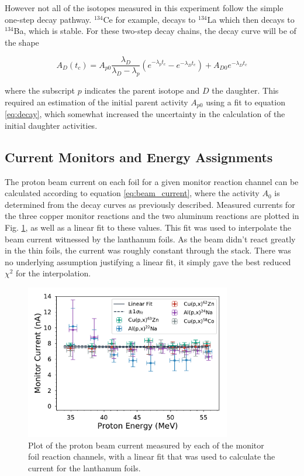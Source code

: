 \documentclass[aps,twocolumn,secnumarabic,balancelastpage,amsmath,amssymb,nofootinbib,floatfix]{revtex4-1}
\begin{document}
However not all of the isotopes measured in this experiment follow the simple one-step decay pathway.  $^{134}$Ce for example, decays to $^{134}$La which then decays to $^{134}$Ba, which is stable.  For these two-step decay chains, the decay curve will be of the shape

\begin{equation}
A_D(t_c) = A_{p0}\frac{\lambda_D}{\lambda_D - \lambda_p}(e^{-\lambda_p t_c}-e^{-\lambda_D t_c})+A_{D0}e^{-\lambda_D t_c}
\end{equation}

where the subscript $p$ indicates the parent isotope and $D$ the daughter.  This required an estimation of the initial parent activity $A_{p0}$ using a fit to equation \ref{eq:decay}, which somewhat increased the uncertainty in the calculation of the initial daughter activities.

\subsection{Current Monitors and Energy Assignments}
\label{monitors}

The proton beam current on each foil for a given monitor reaction channel can be calculated according to equation \ref{eq:beam_current}, where the activity $A_0$ is determined from the decay curves as previously described.  Measured currents for the three copper monitor reactions and the two aluminum reactions are plotted in Fig. \ref{fig:beam_current}, as well as a linear fit to these values. This fit was used to interpolate the beam current witnessed by the lanthanum foils.  As the beam didn't react greatly in the thin foils, the current was roughly constant through the stack. There was no underlying assumption justifying a linear fit, it simply gave the best reduced $\chi^2$ for the interpolation.

\begin{figure}[htb]
\includegraphics[width=9cm]{monitors/current_norm_mcnp}
\caption{Plot of the proton beam current measured by each of the monitor foil reaction channels, with a linear fit that was used to calculate the current for the lanthanum foils.
}
\label{fig:beam_current}
\end{figure}
\end{document}
